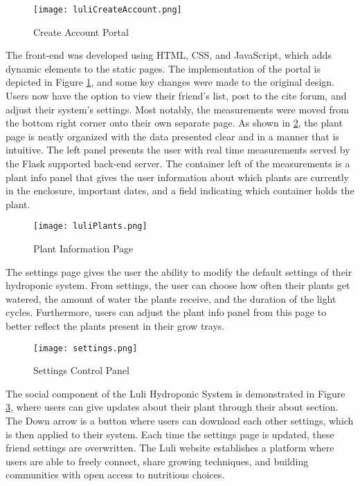 \documentclass[12pt]{article} %
\begin{document}
\begin{figure}[H]
  \centering
  \texttt{[image: luliCreateAccount.png]}
  \caption{Create Account Portal}
  \label{fig: create account}
\end{figure}

The front-end was developed using HTML, CSS, and JavaScript, which adds dynamic elements to the static pages. The implementation of the portal is depicted in Figure \ref{fig: create account}, and some key changes were made to the original design. Users now have the option to view their friend's list, post to the cite forum, and adjust their system's settings. Most notably, the measurements were moved from the bottom right corner onto their own separate page. As shown in \ref{fig: plant page}, the plant page is neatly organized with the data presented clear and in a manner that is intuitive. The left panel presents the user with real time measurements served by the Flask supported back-end server. The container left of the measurements is a plant info panel that gives the user information about which plants are currently in the enclosure, important dates, and a field indicating which container holds the plant. 

\begin{figure}[H]
  \centering
  \texttt{[image: luliPlants.png]}
  \caption{Plant Information Page}
  \label{fig: plant page}
\end{figure}

The settings page gives the user the ability to modify the default settings of their hydroponic system. From settings, the user can choose how often their plants get watered, the amount of water the plants receive, and the duration of the light cycles. Furthermore, users can adjust the plant info panel from this page to better reflect the plants present in their grow trays.

\begin{figure}[H]
  \centering
  \texttt{[image: settings.png]}
  \caption{Settings Control Panel}
  \label{fig: friends page}
\end{figure}

The social component of the Luli Hydroponic System is demonstrated in Figure \ref{fig: friends page}, where users can give updates about their plant through their about section. The Down arrow is a button where users can download each other settings, which is then applied to their system. Each time the settings page is updated, these friend settings are overwritten. The Luli website establishes a platform where users are able to freely connect, share growing techniques, and building communities with open access to nutritious choices. 
\end{document}
